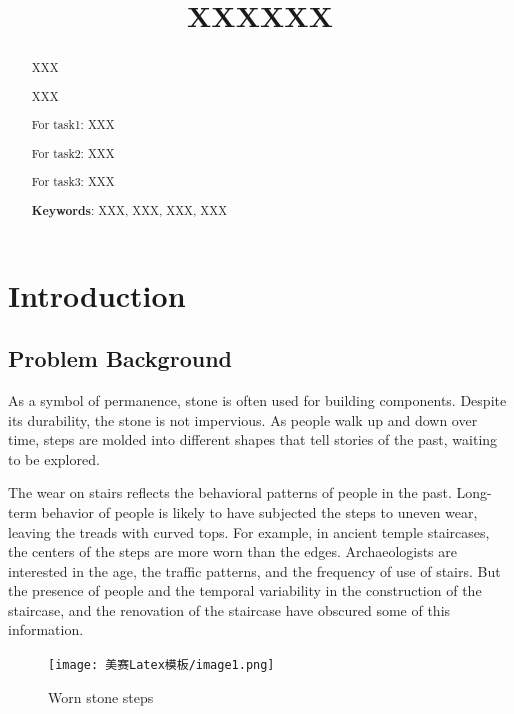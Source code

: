 \documentclass[12pt]{article}  %
\title{XXXXXX}  %
\numberwithin{equation}{section} %
\begin{document}
\begin{abstract}
	
	XXX
	
	XXX
        
    For task1: XXX	

    For task2: XXX

    For task3: XXX

   
	\vspace{5pt}
	\textbf{Keywords}: XXX, XXX, XXX, XXX
	
\end{abstract}
\maketitle  %
\tableofcontents


\section{Introduction}

\subsection{Problem Background}
As a symbol of permanence, stone is often used for building components. Despite its durability, the stone is not impervious. As people walk up and down over time, steps are molded into different shapes that tell stories of the past, waiting to be explored.

The wear on stairs reflects the behavioral patterns of people in the past. Long-term behavior of people is likely to have subjected the steps to uneven wear, leaving the treads with curved tops. For example, in ancient temple staircases, the centers of the steps are more worn than the edges. Archaeologists are interested in the age, the traffic patterns, and the frequency of use of stairs. But the presence of people and the temporal variability in the construction of the staircase, and the renovation of the staircase have obscured some of this information.
\begin{figure}[H]
	\centering
	\texttt{[image: 美赛Latex模板/image1.png]}
	\caption{Worn stone steps}
	\label{stair1}
     \vspace{-2em} %
\end{figure}
\end{document}
